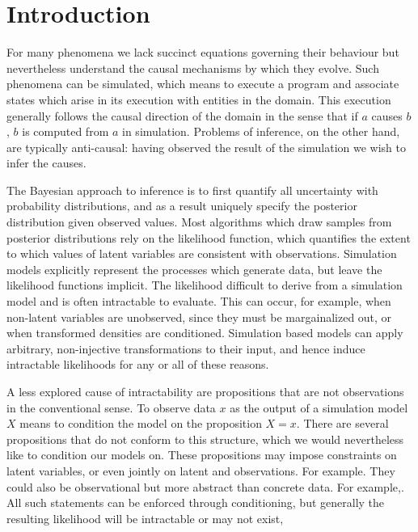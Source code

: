 
\section{Introduction}

For many phenomena we lack succinct equations governing their behaviour but nevertheless understand the causal mechanisms by which they evolve.
Such phenomena can be simulated, which means to execute a program and associate states which arise in its execution with entities in the domain.
This execution generally follows the causal direction of the domain in the sense that if $a$ causes $b$, $b$ is computed from $a$ in simulation.
Problems of inference, on the other hand, are typically anti-causal: having observed the result of the simulation we wish to infer the causes.



The Bayesian approach to inference is to first quantify all uncertainty with probability distributions, and as a result uniquely specify the posterior distribution given observed values.
Most algorithms which draw samples from posterior distributions rely on
the likelihood function, which quantifies the extent to which values of latent variables are consistent with observations.
Simulation models explicitly represent the processes which generate data, but leave the likelihood functions implicit. 
The likelihood  difficult to derive from a simulation model and is often intractable to evaluate.
This can occur, for example, when non-latent variables are unobserved, since they must be margainalized out, or when transformed densities are conditioned.
Simulation based models can apply arbitrary, non-injective transformations to their input, and hence induce intractable likelihoods for any or all of these reasons.

A less explored cause of intractability are propositions that are not observations in the conventional sense.
To observe data $x$ as the output of a simulation model $X$ means to condition the model on the proposition $X = x$.
There are several propositions that do not conform to this structure, which we would nevertheless like to condition our models on.
These propositions may impose constraints on latent variables, or even jointly on latent and observations.
For example.
They could also be observational but more abstract than concrete data.
For example,.
All such statements can be enforced through conditioning, but generally the resulting likelihood will be intractable or may not exist,

